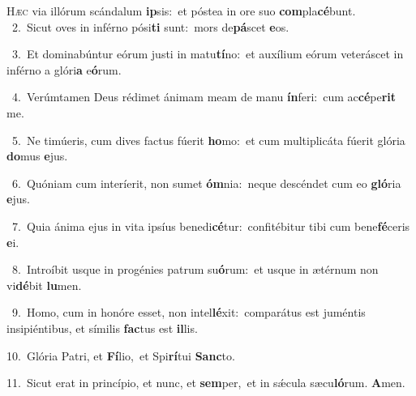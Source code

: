 \lettrine{\initial\textcolor{\initialcolor}{H}}{æc} via illórum scándalum \textbf{ip}\-sis:~\star et póstea in ore suo \textbf{com}\-pla\-\textbf{cé}\-bunt.\\
{\numbfont\textcolor{\numbcolor}{~2.}}~Sicut oves in inférno pósi\textbf{ti} sunt:~\star mors de\-\textbf{pá}\-scet \textbf{e}\-os.\par
{\numbfont\textcolor{\numbcolor}{~3.}}~Et dominabúntur eórum justi in matu\-\textbf{tí}\-no:~\star et auxílium eórum veteráscet in inférno a glóri\textbf{a} e\-\textbf{ó}\-rum.\par
{\numbfont\textcolor{\numbcolor}{~4.}}~Verúmtamen Deus rédimet ánimam meam de manu \textbf{ín}\-feri:~\star cum ac\-\textbf{cé}\-pe\textbf{rit} me.\par
{\numbfont\textcolor{\numbcolor}{~5.}}~Ne timúeris, cum dives factus fúerit \textbf{ho}\-mo:~\star et cum multiplicáta fúerit glória \textbf{do}\-mus \textbf{e}\-jus.\par
{\numbfont\textcolor{\numbcolor}{~6.}}~Quóniam cum interíerit, non sumet \textbf{óm}\-nia:~\star neque descéndet cum eo \textbf{gló}\-ria \textbf{e}\-jus.\par
{\numbfont\textcolor{\numbcolor}{~7.}}~Quia ánima ejus in vita ipsíus benedi\-\textbf{cé}\-tur:~\star confitébitur tibi cum bene\-\textbf{fé}\-ceris \textbf{e}\-i.\par
{\numbfont\textcolor{\numbcolor}{~8.}}~Introíbit usque in progénies patrum su\-\textbf{ó}\-rum:~\star et usque in ætérnum non vi\-\textbf{dé}\-bit \textbf{lu}\-men.\par
{\numbfont\textcolor{\numbcolor}{~9.}}~Homo, cum in honóre esset, non intel\-\textbf{lé}\-xit:~\star comparátus est juméntis insipiéntibus, et símilis \textbf{fac}\-tus est \textbf{il}\-lis.\par
{\numbfont\textcolor{\numbcolor}{10.}}~Glória Patri, et \textbf{Fí}\-lio,~\star et Spi\-\textbf{rí}\-tui \textbf{Sanc}\-to.\par
{\numbfont\textcolor{\numbcolor}{11.}}~Sicut erat in princípio, et nunc, et \textbf{sem}\-per,~\star et in sǽcula sæcu\-\textbf{ló}\-rum. \textbf{A}\-men.\par
